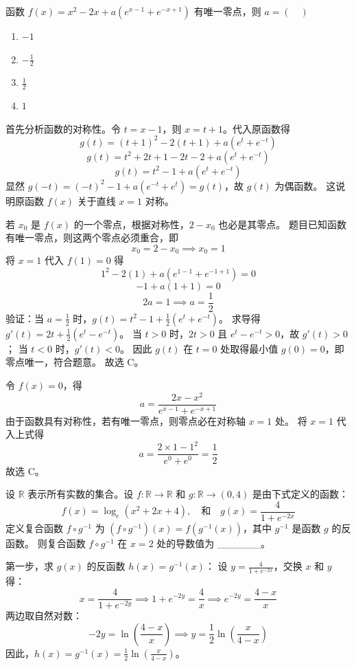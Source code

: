 \begin{questions}
    \question 函数 $f(x) = x^2 - 2x + a \left( e^{x-1} + e^{-x+1} \right)$ 有唯一零点，则 $a = (\quad)$
\begin{enumerate}
    \item $-1$
    \item $-\frac{1}{2}$
    \item $\frac{1}{2}$
    \item $1$
\end{enumerate}

\begin{solution}
首先分析函数的对称性。令 $t = x - 1$，则 $x = t + 1$。代入原函数得
\[
g(t) = (t+1)^2 - 2(t+1) + a \left( e^t + e^{-t} \right)
\]
\[
g(t) = t^2 + 2t + 1 - 2t - 2 + a \left( e^t + e^{-t} \right)
\]
\[
g(t) = t^2 - 1 + a \left( e^t + e^{-t} \right)
\]
显然 $g(-t) = (-t)^2 - 1 + a \left( e^{-t} + e^t \right) = g(t)$，故 $g(t)$ 为偶函数。
这说明原函数 $f(x)$ 关于直线 $x=1$ 对称。

若 $x_0$ 是 $f(x)$ 的一个零点，根据对称性，$2 - x_0$ 也必是其零点。
题目已知函数有唯一零点，则这两个零点必须重合，即
\[
x_0 = 2 - x_0 \implies x_0 = 1
\]
将 $x=1$ 代入 $f(1) = 0$ 得
\[
1^2 - 2(1) + a \left( e^{1-1} + e^{-1+1} \right) = 0
\]
\[
-1 + a(1 + 1) = 0
\]
\[
2a = 1 \implies a = \frac{1}{2}
\]
验证：当 $a = \frac{1}{2}$ 时，$g(t) = t^2 - 1 + \frac{1}{2} \left( e^t + e^{-t} \right)$。
求导得 $g'(t) = 2t + \frac{1}{2} \left( e^t - e^{-t} \right)$。
当 $t > 0$ 时，$2t > 0$ 且 $e^t - e^{-t} > 0$，故 $g'(t) > 0$；
当 $t < 0$ 时，$g'(t) < 0$。
因此 $g(t)$ 在 $t=0$ 处取得最小值 $g(0) = 0$，即零点唯一，符合题意。
故选 C。
\end{solution}
\begin{solution}
令 $f(x) = 0$，得
\[
a = \frac{2x - x^2}{e^{x-1} + e^{-x+1}}
\]
由于函数具有对称性，若有唯一零点，则零点必在对称轴 $x=1$ 处。
将 $x=1$ 代入上式得
\[
a = \frac{2 \times 1 - 1^2}{e^0 + e^0} = \frac{1}{2}
\]
故选 C。
\end{solution}

\question
设 $\mathbb{R}$ 表示所有实数的集合。设 $f: \mathbb{R} \to \mathbb{R}$ 和 $g: \mathbb{R} \to (0, 4)$ 是由下式定义的函数：
\[
f(x) = \log_e(x^2 + 2x + 4), \quad \text{和} \quad g(x) = \frac{4}{1 + e^{-2x}}
\]
定义复合函数 $f \circ g^{-1}$ 为 $(f \circ g^{-1})(x) = f(g^{-1}(x))$，其中 $g^{-1}$ 是函数 $g$ 的反函数。
则复合函数 $f \circ g^{-1}$ 在 $x = 2$ 处的导数值为 \_\_\_\_\_\_。

\begin{solution}
第一步，求 $g(x)$ 的反函数 $h(x) = g^{-1}(x)$：
设 $y = \frac{4}{1 + e^{-2x}}$，交换 $x$ 和 $y$ 得：
\[
x = \frac{4}{1 + e^{-2y}} \implies 1 + e^{-2y} = \frac{4}{x} \implies e^{-2y} = \frac{4-x}{x}
\]
两边取自然对数：
\[
-2y = \ln\left(\frac{4-x}{x}\right) \implies y = \frac{1}{2}\ln\left(\frac{x}{4-x}\right)
\]
因此，$h(x) = g^{-1}(x) = \frac{1}{2}\ln\left(\frac{x}{4-x}\right)$。


\end{solution}
\end{questions}
